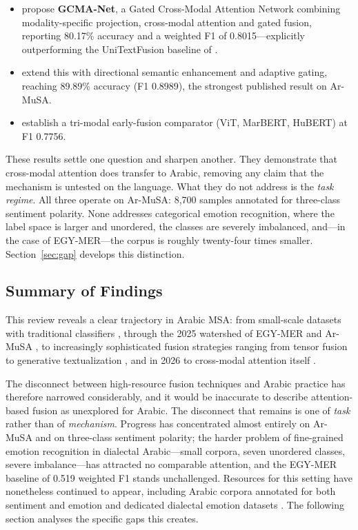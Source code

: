 \documentclass[12pt, a4paper]{article}
\begin{document}
\begin{itemize}
    \item \citet{Cheikhi2026} propose \textbf{GCMA-Net}, a Gated Cross-Modal Attention Network combining modality-specific projection, cross-modal attention and gated fusion, reporting 80.17\% accuracy and a weighted F1 of 0.8015---explicitly outperforming the UniTextFusion baseline of \citet{KhaledUniText2025}.
    \item \citet{Cheikhi2026a} extend this with directional semantic enhancement and adaptive gating, reaching 89.89\% accuracy (F1 0.8989), the strongest published result on Ar-MuSA.
    \item \citet{Cheikhi2026b} establish a tri-modal early-fusion comparator (ViT, MarBERT, HuBERT) at F1 0.7756.
\end{itemize}

These results settle one question and sharpen another. They demonstrate that cross-modal attention does transfer to Arabic, removing any claim that the mechanism is untested on the language. What they do not address is the \emph{task regime}. All three operate on Ar-MuSA: 8{,}700 samples annotated for three-class sentiment polarity. None addresses categorical emotion recognition, where the label space is larger and unordered, the classes are severely imbalanced, and---in the case of EGY-MER---the corpus is roughly twenty-four times smaller. Section~\ref{sec:gap} develops this distinction.

\subsection{Summary of Findings}
This review reveals a clear trajectory in Arabic MSA: from small-scale datasets with traditional classifiers \citep{Alqarafi2019}, through the 2025 watershed of EGY-MER and Ar-MuSA \citep{Hussein2025, Khaled2025}, to increasingly sophisticated fusion strategies ranging from tensor fusion \citep{Dabbabi2025} to generative textualization \citep{KhaledUniText2025}, and in 2026 to cross-modal attention itself \citep{Cheikhi2026, Cheikhi2026a}.

The disconnect between high-resource fusion techniques and Arabic practice has therefore narrowed considerably, and it would be inaccurate to describe attention-based fusion as unexplored for Arabic. The disconnect that remains is one of \emph{task} rather than of \emph{mechanism}. Progress has concentrated almost entirely on Ar-MuSA and on three-class sentiment polarity; the harder problem of fine-grained emotion recognition in dialectal Arabic---small corpora, seven unordered classes, severe imbalance---has attracted no comparable attention, and the EGY-MER baseline of 0.519 weighted F1 stands unchallenged. Resources for this setting have nonetheless continued to appear, including Arabic corpora annotated for both sentiment and emotion \citep{Haouhat2025a} and dedicated dialectal emotion datasets \citep{Ouali2025, Atou2026}. The following section analyses the specific gaps this creates.
\end{document}
